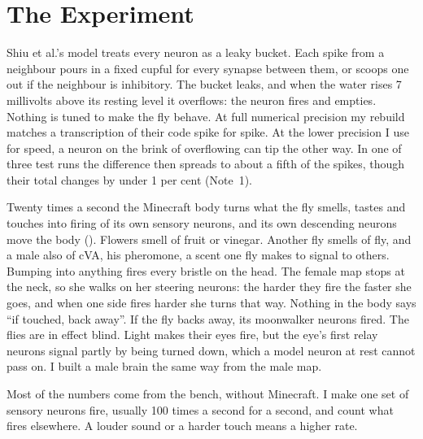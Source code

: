 \documentclass[11pt,a4paper]{article}
\newcommand{\note}[1]{(Note~#1)}
\begin{document}
\section{The Experiment}
\label{sec:experiment}

Shiu et al.'s model treats every neuron as a leaky bucket. Each spike from a neighbour pours in a fixed cupful for every synapse between them, or scoops one out if the neighbour is inhibitory. The bucket leaks, and when the water rises 7 millivolts above its resting level it overflows: the neuron fires and empties. Nothing is tuned to make the fly behave. At full numerical precision my rebuild matches a transcription of their code spike for spike. At the lower precision I use for speed, a neuron on the brink of overflowing can tip the other way. In one of three test runs the difference then spreads to about a fifth of the spikes, though their total changes by under 1 per cent \note{1}.

Twenty times a second the Minecraft body turns what the fly smells, tastes and touches into firing of its own sensory neurons, and its own descending neurons move the body (). Flowers smell of fruit or vinegar. Another fly smells of fly, and a male also of cVA, his pheromone, a scent one fly makes to signal to others. Bumping into anything fires every bristle on the head. The female map stops at the neck, so she walks on her steering neurons: the harder they fire the faster she goes, and when one side fires harder she turns that way. Nothing in the body says ``if touched, back away''. If the fly backs away, its moonwalker neurons fired. The flies are in effect blind. Light makes their eyes fire, but the eye's first relay neurons signal partly by being turned down, which a model neuron at rest cannot pass on. I built a male brain the same way from the male map.

Most of the numbers come from the bench, without Minecraft. I make one set of sensory neurons fire, usually 100 times a second for a second, and count what fires elsewhere. A louder sound or a harder touch means a higher rate.
\end{document}
